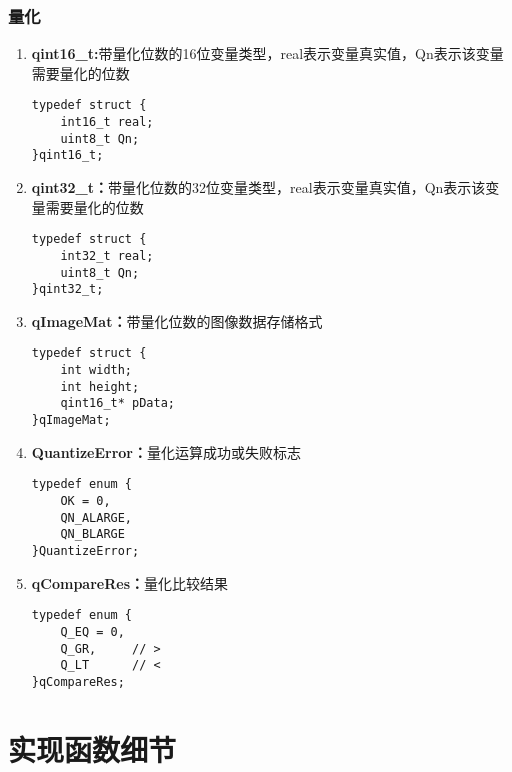 \documentclass[12pt, a4paper, oneside]{ctexbook}
\begin{document}
		\subsection{量化}
		\begin{enumerate}
			\item \textbf{qint16\_t:}带量化位数的16位变量类型，real表示变量真实值，Qn表示该变量需要量化的位数
				\begin{lstlisting}
typedef struct {
	int16_t real;		
	uint8_t Qn;			
}qint16_t;					
				\end{lstlisting}
			\item \textbf{qint32\_t：}带量化位数的32位变量类型，real表示变量真实值，Qn表示该变量需要量化的位数
				\begin{lstlisting}
typedef struct {
	int32_t real;	
	uint8_t Qn;		
}qint32_t;				
			\end{lstlisting}
			\item \textbf{qImageMat：}带量化位数的图像数据存储格式
				\begin{lstlisting}
typedef struct {
	int width;
	int height;
	qint16_t* pData;
}qImageMat;			
			\end{lstlisting}
			\item \textbf{QuantizeError：}量化运算成功或失败标志
				\begin{lstlisting}
typedef enum {
	OK = 0,
	QN_ALARGE,
	QN_BLARGE
}QuantizeError;		
			\end{lstlisting}
			\item \textbf{qCompareRes：}量化比较结果
				\begin{lstlisting}
typedef enum {
	Q_EQ = 0,	
	Q_GR,     // >
	Q_LT      // <
}qCompareRes;		
				\end{lstlisting}
			
		\end{enumerate}

	
	
	
	
	
	\chapter{实现函数细节}	
\end{document}
